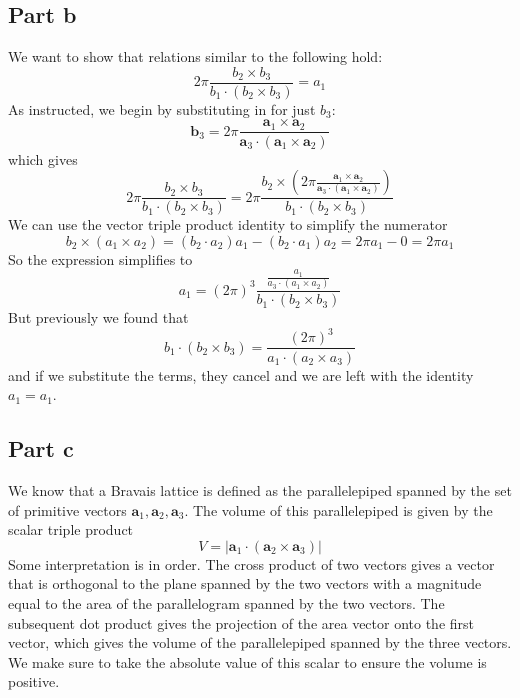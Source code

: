 \documentclass[12pt]{article}
\begin{document}
\subsection{Part b}
We want to show that relations similar to the following hold:
\begin{equation}
2 \pi \frac{b_2 \times b_3}{b_1 \cdot\left(b_2 \times b_3\right)}=a_1
\end{equation}
As instructed, we begin by substituting in for just $b_3$:
\begin{equation}
    \mathbf{b}_3=2 \pi \frac{\mathbf{a}_1 \times \mathbf{a}_2}{\mathbf{a}_3 \cdot\left(\mathbf{a}_1 \times \mathbf{a}_2\right)}
\end{equation}
which gives
\begin{equation}
    2 \pi \frac{b_2 \times b_3}{b_1 \cdot\left(b_2 \times b_3\right)}=2 \pi \frac{b_2 \times \left(2 \pi \frac{\mathbf{a}_1 \times \mathbf{a}_2}{\mathbf{a}_3 \cdot\left(\mathbf{a}_1 \times \mathbf{a}_2\right)}\right)}{b_1 \cdot\left(b_2 \times b_3\right)}
\end{equation}
We can use the vector triple product identity to simplify the numerator
\begin{equation}
    b_2 \times \left(a_1 \times a_2\right) = (b_2 \cdot a_2)a_1 - (b_2 \cdot a_1)a_2 = 2\pi a_1 - 0 = 2\pi a_1
\end{equation}
So the expression simplifies to
\begin{equation}
    a_1 = \left(2\pi \right)^3 \frac{\frac{a_1}{a_3 \cdot\left(a_1 \times a_2\right)}}{b_1 \cdot\left(b_2 \times b_3\right)}
\end{equation}
But previously we found that
\begin{equation}
    b_1 \cdot\left(b_2 \times b_3\right)=\frac{(2 \pi)^3}{a_1 \cdot\left(a_2 \times a_3\right)}
\end{equation}
and if we substitute the terms, they cancel and we are left with the identity $a_1 = a_1$.
\subsection{Part c}
We know that a Bravais lattice is defined as the parallelepiped spanned by the set of primitive vectors $\mathbf{a}_1, \mathbf{a}_2, \mathbf{a}_3$. The volume of this parallelepiped is given by the scalar triple product
\begin{equation}
    V = |\mathbf{a}_1 \cdot \left(\mathbf{a}_2 \times \mathbf{a}_3\right)|
\end{equation}
Some interpretation is in order. The cross product of two vectors gives a vector that is orthogonal to the plane spanned by the two vectors with a magnitude equal to the area of the parallelogram spanned by the two vectors. The subsequent dot product gives the projection of the area vector onto the first vector, which gives the volume of the parallelepiped spanned by the three vectors. We make sure to take the absolute value of this scalar to ensure the volume is positive.
\end{document}
